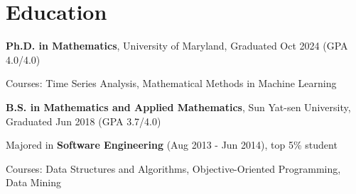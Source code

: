 \section{Education}

\textbf{Ph.D. in Mathematics}, University of Maryland, Graduated Oct 2024 (GPA 4.0/4.0)
\begin{customItem}
\item Courses: Time Series Analysis, Mathematical Methods in Machine Learning
\end{customItem}

\textbf{B.S. in Mathematics and Applied Mathematics}, Sun Yat-sen University, Graduated Jun 2018 (GPA 3.7/4.0)

\begin{customItem}
\item Majored in \textbf{Software Engineering} (Aug 2013 - Jun 2014), top 5\% student
\item Courses: Data Structures and Algorithms, Objective-Oriented Programming, Data Mining
\end{customItem}